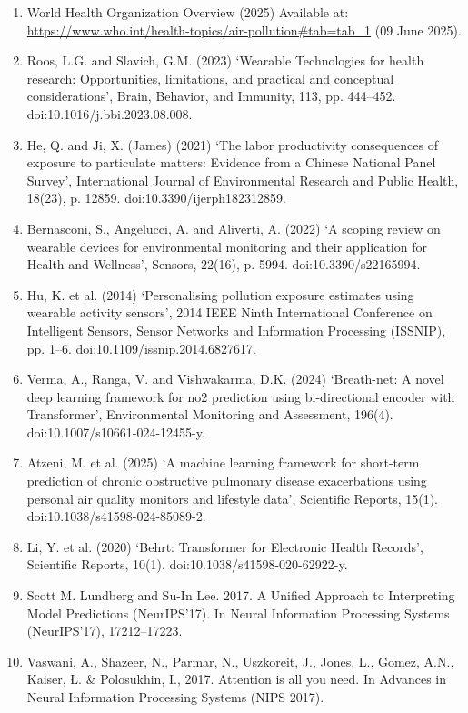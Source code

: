 \documentclass[
]{article}
\begin{document}
\begin{enumerate}
\def\labelenumi{\arabic{enumi}.}
\item
  World Health Organization Overview (2025) Available at:
  \url{https://www.who.int/health-topics/air-pollution\#tab=tab_1} (09
  June 2025).
\item
  Roos, L.G. and Slavich, G.M. (2023) `Wearable Technologies for health
  research: Opportunities, limitations, and practical and conceptual
  considerations', Brain, Behavior, and Immunity, 113, pp. 444--452.
  doi:10.1016/j.bbi.2023.08.008.
\item
  He, Q. and Ji, X. (James) (2021) `The labor productivity consequences
  of exposure to particulate matters: Evidence from a Chinese National
  Panel Survey', International Journal of Environmental Research and
  Public Health, 18(23), p. 12859. doi:10.3390/ijerph182312859.
\item
  Bernasconi, S., Angelucci, A. and Aliverti, A. (2022) `A scoping
  review on wearable devices for environmental monitoring and their
  application for Health and Wellness', Sensors, 22(16), p. 5994.
  doi:10.3390/s22165994.
\item
  Hu, K. et al. (2014) `Personalising pollution exposure estimates using
  wearable activity sensors', 2014 IEEE Ninth International Conference
  on Intelligent Sensors, Sensor Networks and Information Processing
  (ISSNIP), pp. 1--6. doi:10.1109/issnip.2014.6827617.
\item
  Verma, A., Ranga, V. and Vishwakarma, D.K. (2024) `Breath-net: A novel
  deep learning framework for no2 prediction using bi-directional
  encoder with Transformer', Environmental Monitoring and Assessment,
  196(4). doi:10.1007/s10661-024-12455-y.
\item
  Atzeni, M. et al. (2025) `A machine learning framework for short-term
  prediction of chronic obstructive pulmonary disease exacerbations
  using personal air quality monitors and lifestyle data', Scientific
  Reports, 15(1). doi:10.1038/s41598-024-85089-2.
\item
  Li, Y. et al. (2020) `Behrt: Transformer for Electronic Health
  Records', Scientific Reports, 10(1). doi:10.1038/s41598-020-62922-y.
\item
  Scott M. Lundberg and Su-In Lee. 2017. A Unified Approach to
  Interpreting Model Predictions (NeurIPS'17). In Neural Information
  Processing Systems (NeurIPS'17), 17212--17223.
\item
  Vaswani, A., Shazeer, N., Parmar, N., Uszkoreit, J., Jones, L., Gomez,
  A.N., Kaiser, Ł. \& Polosukhin, I., 2017. Attention is all you need.
  In Advances in Neural Information Processing Systems (NIPS 2017).
\end{enumerate}
\end{document}

